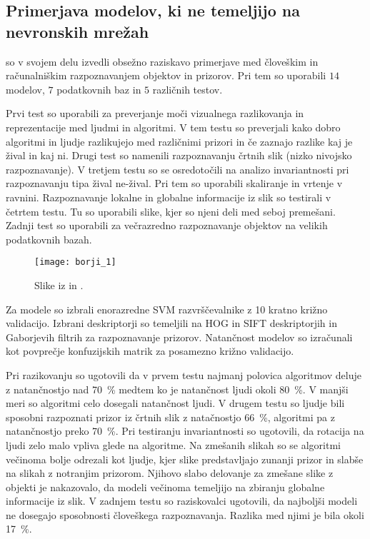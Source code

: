 \subsection{Primerjava modelov, ki ne temeljijo na nevronskih mrežah}
 so v svojem delu izvedli obsežno raziskavo primerjave med človeškim in računalniškim razpoznavanjem objektov in prizorov. Pri tem so uporabili $14$ modelov, $7$ podatkovnih baz in $5$ različnih testov. 

Prvi test so uporabili za preverjanje moči vizualnega razlikovanja in reprezentacije med ljudmi in algoritmi. V tem testu so preverjali kako dobro algoritmi in ljudje razlikujejo med različnimi prizori in če zaznajo razlike kaj je žival in kaj ni. Drugi test so namenili razpoznavanju črtnih slik (nizko nivojsko razpoznavanje). V tretjem testu so se osredotočili na analizo invariantnosti pri razpoznavanju tipa žival ne-žival. Pri tem so uporabili skaliranje in vrtenje v ravnini. Razpoznavanje lokalne in globalne informacije iz slik so testirali v četrtem testu. Tu so uporabili slike, kjer so njeni deli med seboj premešani. Zadnji test so uporabili za večrazredno razpoznavanje objektov na velikih podatkovnih bazah.

\begin{figure}[!htbp]
	\centering
	\texttt{[image: borji\_1]}
	\caption{Slike iz \cite{xiao2010sun} in \cite{griffin2007caltech}.}
\end{figure}

Za modele so izbrali enorazredne SVM razvrščevalnike z 10 kratno križno validacijo. Izbrani deskriptorji so temeljili na HOG in SIFT deskriptorjih in Gaborjevih filtrih za razpoznavanje prizorov. Natančnost modelov so izračunali kot povprečje konfuzijskih matrik za posamezno križno validacijo. 

Pri razikovanju so ugotovili da v prvem testu najmanj polovica algoritmov deluje z natančnostjo nad \SI{70}{\%} medtem ko je natančnost ljudi okoli \SI{80}{\%}. V manjši meri so algoritmi celo dosegali natančnost ljudi. V drugem testu so ljudje bili sposobni razpoznati prizor iz črtnih slik z natačnostjo \SI{66}{\%}, algoritmi pa z natančnostjo preko \SI{70}{\%}. Pri testiranju invariantnosti so ugotovili, da rotacija na ljudi zelo malo vpliva glede na algoritme. Na zmešanih slikah so se algoritmi večinoma bolje odrezali kot ljudje, kjer slike predstavljajo zunanji prizor in slabše na slikah z notranjim prizorom. Njihovo slabo delovanje za zmešane slike z objekti je nakazovalo, da modeli večinoma temeljijo na zbiranju globalne informacije iz slik. V zadnjem testu so raziskovalci ugotovili, da najboljši modeli ne dosegajo sposobnosti človeškega razpoznavanja. Razlika med njimi je bila okoli \SI{17}{\%}.


